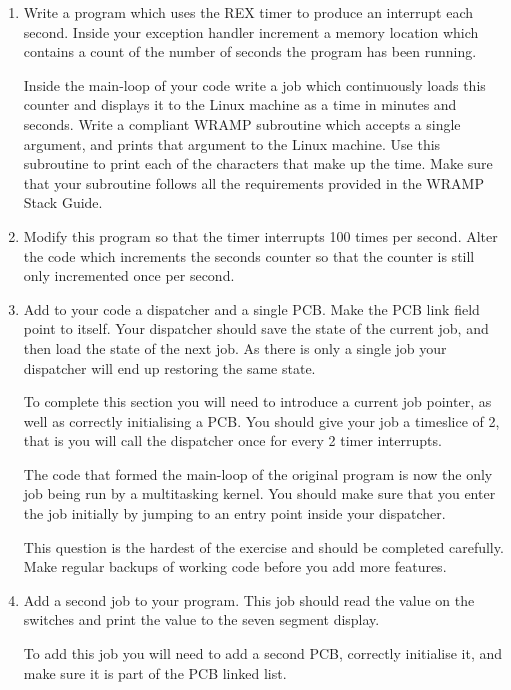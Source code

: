 \documentclass[a4paper,10pt]{article}
\begin{document}
\begin{enumerate}
\item Write a program which uses the REX timer to produce an interrupt
each second. Inside your exception handler increment a memory location
which contains a count of the number of seconds the program has been
running.

Inside the main-loop of your code write a job which continuously loads
this counter and displays it to the Linux machine as a time in minutes
and seconds. Write a compliant WRAMP subroutine which accepts a single
argument, and prints that argument to the Linux machine. Use this
subroutine to print each of the characters that make up the time. Make
sure that your subroutine follows all the requirements provided in the
WRAMP Stack Guide.

\item
\label{ques:parta}

Modify this program so that the timer interrupts 100 times per
second. Alter the code which increments the seconds counter so that
the counter is still only incremented once per second.

\item Add to your code a dispatcher and a single PCB. Make the PCB
link field point to itself. Your dispatcher should save the state of
the current job, and then load the state of the next job. As there is
only a single job your dispatcher will end up restoring the same
state.

To complete this section you will need to introduce a current job
pointer, as well as correctly initialising a PCB. You should give your
job a timeslice of 2, that is you will call the dispatcher once for
every 2 timer interrupts.

The code that formed the main-loop of the original program is now the
only job being run by a multitasking kernel. You should make sure that
you enter the job initially by jumping to an entry point inside your
dispatcher.

This question is the hardest of the exercise and should be completed
carefully. Make regular backups of working code before you add more
features.

\item Add a second job to your program. This job should read the value
on the switches and print the value to the seven segment display.

To add this job you will need to add a second PCB, correctly
initialise it, and make sure it is part of the PCB linked list.


\end{enumerate}
\end{document}
